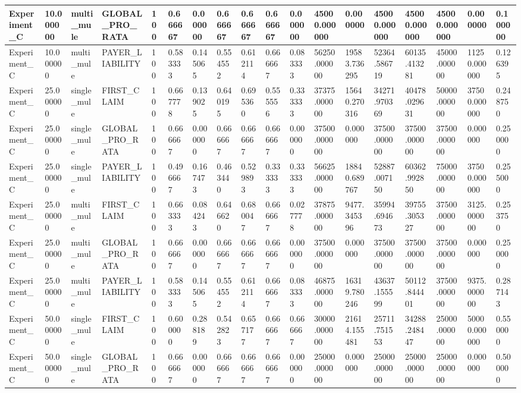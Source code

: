 \begin{tabular}{|l|l|l|l|l|l|l|l|l|l|l|l|l|l|l|l|l|l|}
Experiment\_C & 10.000000 & multi\_mule & GLOBAL\_PRO\_RATA & 100 & 0.666667 & 0.000000 & 0.666667 & 0.666667 & 0.666667 & 0.000000 & 45000.000000 & 0.000000 & 45000.000000 & 45000.000000 & 45000.000000 & 0.000000 & 0.100000 \\ \hline
Experiment\_C & 10.000000 & multi\_mule & PAYER\_LIABILITY & 100 & 0.583333 & 0.145065 & 0.554552 & 0.612114 & 0.666667 & 0.083333 & 56250.000000 & 19583.736295 & 52364.586719 & 60135.413281 & 45000.000000 & 11250.000000 & 0.126395 \\ \hline
Experiment\_C & 25.000000 & single\_mule & FIRST\_CLAIM & 100 & 0.667778 & 0.139025 & 0.640195 & 0.695360 & 0.555556 & 0.333333 & 37375.000000 & 15640.270316 & 34271.970369 & 40478.029631 & 50000.000000 & 37500.000000 & 0.248750 \\ \hline
Experiment\_C & 25.000000 & single\_mule & GLOBAL\_PRO\_RATA & 100 & 0.666667 & 0.000000 & 0.666667 & 0.666667 & 0.666667 & 0.000000 & 37500.000000 & 0.000000 & 37500.000000 & 37500.000000 & 37500.000000 & 0.000000 & 0.250000 \\ \hline
Experiment\_C & 25.000000 & single\_mule & PAYER\_LIABILITY & 100 & 0.496667 & 0.167473 & 0.463440 & 0.529893 & 0.333333 & 0.333333 & 56625.000000 & 18840.689767 & 52887.007150 & 60362.992850 & 75000.000000 & 37500.000000 & 0.255000 \\ \hline
Experiment\_C & 25.000000 & multi\_mule & FIRST\_CLAIM & 100 & 0.663333 & 0.084243 & 0.646620 & 0.680047 & 0.666667 & 0.027778 & 37875.000000 & 9477.345396 & 35994.694673 & 39755.305327 & 37500.000000 & 3125.000000 & 0.253750 \\ \hline
Experiment\_C & 25.000000 & multi\_mule & GLOBAL\_PRO\_RATA & 100 & 0.666667 & 0.000000 & 0.666667 & 0.666667 & 0.666667 & 0.000000 & 37500.000000 & 0.000000 & 37500.000000 & 37500.000000 & 37500.000000 & 0.000000 & 0.250000 \\ \hline
Experiment\_C & 25.000000 & multi\_mule & PAYER\_LIABILITY & 100 & 0.583333 & 0.145065 & 0.554552 & 0.612114 & 0.666667 & 0.083333 & 46875.000000 & 16319.780246 & 43637.155599 & 50112.844401 & 37500.000000 & 9375.000000 & 0.287143 \\ \hline
Experiment\_C & 50.000000 & single\_mule & FIRST\_CLAIM & 100 & 0.600000 & 0.288189 & 0.542823 & 0.657177 & 0.666667 & 0.666667 & 30000.000000 & 21614.155481 & 25711.751553 & 34288.248447 & 25000.000000 & 50000.000000 & 0.550000 \\ \hline
Experiment\_C & 50.000000 & single\_mule & GLOBAL\_PRO\_RATA & 100 & 0.666667 & 0.000000 & 0.666667 & 0.666667 & 0.666667 & 0.000000 & 25000.000000 & 0.000000 & 25000.000000 & 25000.000000 & 25000.000000 & 0.000000 & 0.500000 \\ \hline

\end{tabular}
